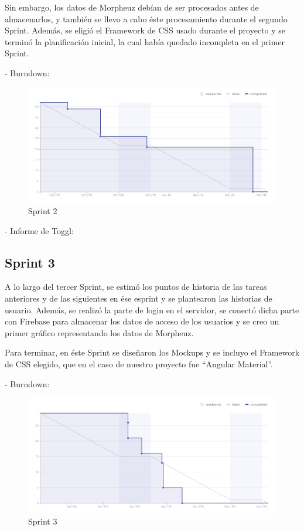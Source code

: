 \documentclass[11pt,openany]{book}
\begin{document}
Sin embargo, los datos de Morpheuz debían de ser procesados antes de almacenarlos, y también se llevo a cabo éste procesamiento durante el segundo Sprint. Además, se eligió el Framework de CSS usado durante el proyecto y se terminó la planificación inicial, la cual había quedado incompleta en el primer Sprint.

- Burndown:

\begin{figure}[H]
\centering
\includegraphics[totalheight=7cm]{burndowns/Sprint2.png}
\caption{Sprint 2}
\end{figure}

- Informe de Toggl:



\subsection{Sprint 3}

A lo largo del tercer Sprint, se estimó los puntos de historia de las tareas anteriores y de las siguientes en ése esprint y se plantearon las historias de usuario. Además, se realizó la parte de login en el servidor, se conectó dicha parte con Firebase para almacenar los datos de acceso de los usuarios y se creo un primer gráfico representando los datos de Morpheuz. 

Para terminar, en éste Sprint se diseñaron los Mockups y se incluyo el Framework de CSS elegido, que en el caso de nuestro proyecto fue ``Angular Material''.

- Burndown:

\begin{figure}[H]
\centering
\includegraphics[totalheight=7cm]{burndowns/Sprint3.png}
\caption{Sprint 3}
\end{figure}
\end{document}
